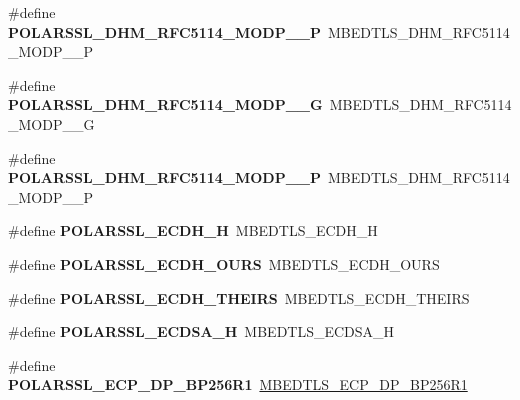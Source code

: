 \begin{DoxyCompactItemize}
\item 
\mbox{\label{compat-1_83_8h_a0248d4be4b217add62ee524094320f26}} 
\#define {\bfseries P\+O\+L\+A\+R\+S\+S\+L\+\_\+\+D\+H\+M\+\_\+\+R\+F\+C5114\+\_\+\+M\+O\+D\+P\+\_\+\_\+P}~M\+B\+E\+D\+T\+L\+S\+\_\+\+D\+H\+M\+\_\+\+R\+F\+C5114\+\_\+\+M\+O\+D\+P\+\_\+\_\+P
\item 
\mbox{\label{compat-1_83_8h_a404a263e2f02952ab26ce71de5770d86}} 
\#define {\bfseries P\+O\+L\+A\+R\+S\+S\+L\+\_\+\+D\+H\+M\+\_\+\+R\+F\+C5114\+\_\+\+M\+O\+D\+P\+\_\+\_\+G}~M\+B\+E\+D\+T\+L\+S\+\_\+\+D\+H\+M\+\_\+\+R\+F\+C5114\+\_\+\+M\+O\+D\+P\+\_\+\_\+G
\item 
\mbox{\label{compat-1_83_8h_ad57332be7b632e9ddd678a4cc0750b91}} 
\#define {\bfseries P\+O\+L\+A\+R\+S\+S\+L\+\_\+\+D\+H\+M\+\_\+\+R\+F\+C5114\+\_\+\+M\+O\+D\+P\+\_\+\_\+P}~M\+B\+E\+D\+T\+L\+S\+\_\+\+D\+H\+M\+\_\+\+R\+F\+C5114\+\_\+\+M\+O\+D\+P\+\_\+\_\+P
\item 
\mbox{\label{compat-1_83_8h_a899a7dad06e98f5d3f3617343f096cac}} 
\#define {\bfseries P\+O\+L\+A\+R\+S\+S\+L\+\_\+\+E\+C\+D\+H\+\_\+H}~M\+B\+E\+D\+T\+L\+S\+\_\+\+E\+C\+D\+H\+\_\+H
\item 
\mbox{\label{compat-1_83_8h_a79e7a235ff6be6614a81eb2cd670df81}} 
\#define {\bfseries P\+O\+L\+A\+R\+S\+S\+L\+\_\+\+E\+C\+D\+H\+\_\+\+O\+U\+RS}~M\+B\+E\+D\+T\+L\+S\+\_\+\+E\+C\+D\+H\+\_\+\+O\+U\+RS
\item 
\mbox{\label{compat-1_83_8h_a2876ce805a250c47b563370cb79e390e}} 
\#define {\bfseries P\+O\+L\+A\+R\+S\+S\+L\+\_\+\+E\+C\+D\+H\+\_\+\+T\+H\+E\+I\+RS}~M\+B\+E\+D\+T\+L\+S\+\_\+\+E\+C\+D\+H\+\_\+\+T\+H\+E\+I\+RS
\item 
\mbox{\label{compat-1_83_8h_a8f708bc7fafe0999f7ea57944c3e9e02}} 
\#define {\bfseries P\+O\+L\+A\+R\+S\+S\+L\+\_\+\+E\+C\+D\+S\+A\+\_\+H}~M\+B\+E\+D\+T\+L\+S\+\_\+\+E\+C\+D\+S\+A\+\_\+H
\item 
\mbox{\label{compat-1_83_8h_a04aeee4b9a9a4a6d17e289caf8b5a213}} 
\#define {\bfseries P\+O\+L\+A\+R\+S\+S\+L\+\_\+\+E\+C\+P\+\_\+\+D\+P\+\_\+\+B\+P256\+R1}~\mbox{\hyperlink{ecp_8h_af79e530ea8f8416480f805baa20b1a2dade9d3762e81c6e1d6e499d21e8190be5}{M\+B\+E\+D\+T\+L\+S\+\_\+\+E\+C\+P\+\_\+\+D\+P\+\_\+\+B\+P256\+R1}}

\end{DoxyCompactItemize}
